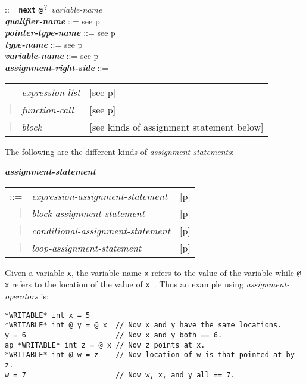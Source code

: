 \documentclass[12pt]{article}
\newcommand{\TT}[1]{{\tt \bfseries #1}}
\newcommand{\QMARK}{{$^{\,\mbox{\footnotesize ?}}$}}
\newcommand{\ttkey}[1]{{\tt \bfseries #1}}
\newcommand{\emkey}[1]{{\em \bfseries #1}}
\newcommand{\pagref}[1]{p\pageref{#1}}
\newenvironment{indpar}[1][0.3in]%
	{\begin{list}{}%
		     {\setlength{\itemsep}{0in}%
		      \setlength{\topsep}{0in}%
		      \setlength{\parsep}{1ex}%
		      \setlength{\labelwidth}{#1}%
		      \setlength{\leftmargin}{#1}%
		      \addtolength{\leftmargin}{\labelsep}}%
	 \item}%
	{\end{list}}
\begin{document}
\begin{indpar}
    ::= \ttkey{next} \TT{@}\QMARK{} {\em variable-name}
\\[0.5ex]
\emkey{qualifier-name} ::= see \pagref{QUALIFIER-NAME}
\\[0.5ex]
\emkey{pointer-type-name} ::= see \pagref{POINTER-TYPE-NAME}
\\[0.5ex]
\emkey{type-name} ::= see \pagref{TYPE-NAME}
\\[0.5ex]
\emkey{variable-name} ::= see \pagref{VARIABLE-NAME}
\\[0.5ex]
\emkey{assignment-right-side}\label{ASSIGNMENT-RIGHT-SIDE} ::= \\
\hspace*{1in}
    \begin{tabular}[t]{@{}rll}
        & {\em expression-list}
    		& [see \pagref{EXPRESSION-LIST}] \\
    $|$ & {\em function-call}
    		& [see \pagref{FUNCTION-CALLS}] \\
    $|$ & {\em block}
	        & [see kinds of assignment statement below] \\
    \end{tabular}
\end{indpar}

The following are the different kinds of {\em assignment-statements}:
\begin{indpar}
\emkey{assignment-statement}
    \begin{tabular}[t]{@{}rll}
    ::= & {\em expression-assignment-statement}
    	& [\pagref{EXPRESSION-ASSIGNMENT-STATEMENTS}] \\
    $|$ & {\em block-assignment-statement}
        & [\pagref{BLOCK-ASSIGNMENT-STATEMENTS}] \\
    $|$ & {\em conditional-assignment-statement}
        & [\pagref{CONDITIONAL-ASSIGNMENT-STATEMENTS}] \\
    $|$ & {\em loop-assignment-statement}
        & [\pagref{LOOP-ASSIGNMENT-STATEMENTS}] \\
    \end{tabular}
\end{indpar}


Given a variable {\tt x}, the variable name {\tt x} refers to the
value of the variable while {\tt @ x} refers to the location of
the value of {\tt x }.
Thus an example using {\em assignment-operators} is:
\begin{indpar}\begin{verbatim}
*WRITABLE* int x = 5
*WRITABLE* int @ y = @ x  // Now x and y have the same locations.
y = 6                     // Now x and y both == 6.
ap *WRITABLE* int z = @ x // Now z points at x.
*WRITABLE* int @ w = z    // Now location of w is that pointed at by z.
w = 7                     // Now w, x, and y all == 7.
\end{verbatim}\end{indpar}
\end{document}
